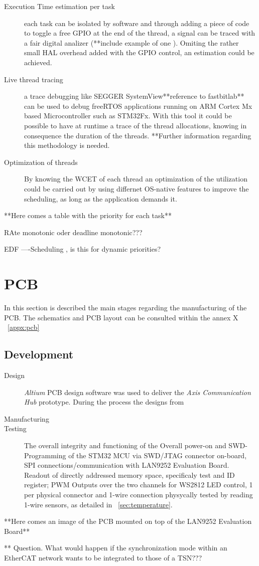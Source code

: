 \begin{description}
\item[Execution Time estimation per task] each task can be isolated by software and through adding a piece of code to toggle a free GPIO at the end of the thread, a signal can be traced with a fair digital analizer (**include example of one ). Omiting the rather small HAL overhead added with the GPIO control, an estimation could be achieved.
\item[Live thread tracing]  a trace debugging like SEGGER SystemView**reference to fastbitlab** can be used to debug freeRTOS applications running on ARM Cortex Mx based Microcontroller such as STM32Fx. With this tool it could be possible to have at runtime a trace of the thread allocations, knowing in consequence the duration of the threads. **Further information regarding this methodology is needed.
\item[Optimization of threads] By knowing the WCET of each thread an optimization of the utilization could be carried out by using differnet OS-native features to improve the scheduling, as long as the application demands it.
\end{description}


**Here comes a table with the priority for each task**

RAte monotonic oder deadline monotonic???


EDF ----Scheduling , is this for dynamic priorities?

\section{PCB}

In this section is described the main stages regarding the manufacturing of the PCB. The schematics and PCB layout can be consulted within the annex X ~\ref{appx:pcb}

\subsection{Development}
\begin{description}
\item[Design] \emph{Altium} PCB design software was used to deliver the \emph{Axis Communication Hub} prototype. During the process the designs from
\item[Manufacturing]
\item[Testing] The overall integrity and functioning of the  Overall power-on and SWD-Programming of the STM32 MCU via SWD/JTAG connector on-board, SPI connections/communication with LAN9252 Evaluation Board. Readout of directly addressed memory space, specificaly test and ID register; PWM Outputs over the two channels for WS2812 LED control, 1 per physical connector and 1-wire connection physycally tested by reading 1-wire sensors, as detailed in ~\ref{sec:temperature}.
\end{description}

**Here comes an image of the PCB mounted on top of the LAN9252 Evaluation Board**


** Question. What would happen if the synchronization mode within an EtherCAT network wants to be integrated to those of a TSN???


